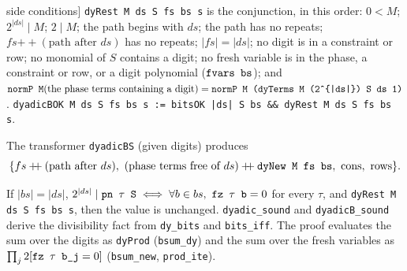 \begin{definition}[[Dyadic] side conditions]\label{def:lean-pathsum-dyrest}
\textnormal{\texttt{dyRest M ds S fs bs s}} is the conjunction, in this order:
$0<M$; $2^{|ds|}\mid M$; $2\mid M$; the path begins with $ds$; the path has no repeats;
$fs\mathbin{+\!\!+}(\text{path}\text{ after }ds)$ has no repeats; $|fs| = |ds|$; no digit is in a
constraint or row; no monomial of $S$ contains a digit; no fresh variable is in the phase, a
constraint or row, or a digit polynomial ($\textnormal{\texttt{fvars bs}}$); and
$\textnormal{\texttt{normP M}}(\text{the phase terms containing a digit}) = \textnormal{\texttt{normP M (\allowbreak{}dyTerms M (\allowbreak{}2\^{}\{|ds|\}) S ds 1)}}$.
\textnormal{\texttt{dyadicBOK M ds S fs bs s := bitsOK |ds| S bs \&\& dyRest M ds S fs bs s}}.
\end{definition}

\noindent The transformer \textnormal{\texttt{dyadicBS}} (given digits) produces
\[
\{fs\mathbin{+\!\!+}(\text{path after } ds),\ (\text{phase terms free of } ds)\mathbin{+\!\!+}\textnormal{\texttt{dyNew M fs bs}},\ \text{cons},\ \text{rows}\}.
\]
\begin{theorem}
If $|bs|=|ds|$, $2^{|ds|}\mid\textnormal{\texttt{pn \ensuremath{\tau} S}}\iff\forall b\in bs,\ \textnormal{\texttt{fz \ensuremath{\tau} b}}=0$ for every $\tau$,
and \textnormal{\texttt{dyRest M ds S fs bs s}}, then the value is unchanged. \textnormal{\texttt{dyadic\_\allowbreak{}sound}} and
\textnormal{\texttt{dyadicB\_\allowbreak{}sound}} derive the divisibility fact from \textnormal{\texttt{dy\_\allowbreak{}bits}} and \textnormal{\texttt{bits\_\allowbreak{}iff}}. The
proof evaluates the sum over the digits as \textnormal{\texttt{dyProd}} (\textnormal{\texttt{bsum\_\allowbreak{}dy}}) and the sum over the fresh
variables as $\prod_j 2[\textnormal{\texttt{fz \ensuremath{\tau} b\_\allowbreak{}j}} = 0]$ (\textnormal{\texttt{bsum\_\allowbreak{}new}}, \textnormal{\texttt{prod\_\allowbreak{}ite}}).
\end{theorem}

